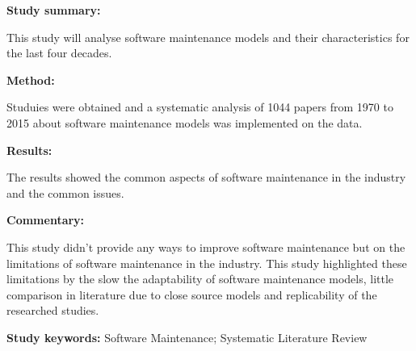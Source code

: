 \begin{tcolorbox}[colback=gray!5!white, colframe=pastelgreen!40!black, title=Analyzing Forty Years of Software Maintenance Models\cite{Lenarduzzi2017}]
	\begin{minipage}[t]{0.25\textwidth}
		\textbf{Study summary:}
	\end{minipage}
	\hfill
	\begin{minipage}[t]{0.65\textwidth}
		This study will analyse software maintenance models and their characteristics for the last
		four decades.
	\end{minipage}

	\vspace{0.75em} 

	\begin{minipage}[t]{0.25\textwidth}
		\textbf{Method:}
	\end{minipage}
	\hfill
	\begin{minipage}[t]{0.65\textwidth}
		Studuies were obtained and a systematic analysis of 1044 papers from 1970 to 2015 about software maintenance models was implemented on the data.
	\end{minipage}

	\vspace{0.75em} 

	\begin{minipage}[t]{0.25\textwidth}
		\textbf{Results:}
	\end{minipage}
	\hfill
	\begin{minipage}[t]{0.65\textwidth}
		The results showed the common aspects of software maintenance in the industry and the common issues.
	\end{minipage}

	\vspace{0.75em} 

	\begin{minipage}[t]{0.25\textwidth}
		\textbf{Commentary:}
	\end{minipage}
	\hfill
	\begin{minipage}[t]{0.65\textwidth}
		This study didn't provide any ways to improve software maintenance but on the limitations of
		software maintenance in the industry. This study highlighted these limitations by the slow
		the adaptability of software maintenance models, little comparison in literature due to close
		source models and replicability of the researched studies.
	\end{minipage}
	\tcblower
	\textbf{Study keywords:} Software Maintenance; Systematic Literature Review
\end{tcolorbox}

